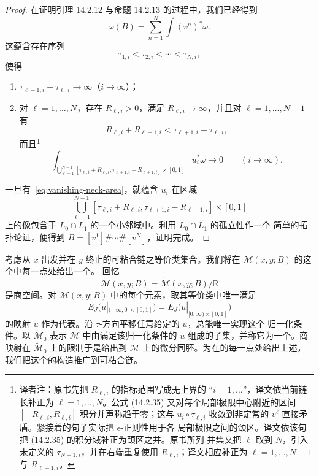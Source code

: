 \begin{proof}
在证明引理 14.2.12 与命题 14.2.13 的过程中，我们已经得到
\[
  \omega(B)
  =
  \sum_{n=1}^N\int(v^n)^*\omega.
\]
这蕴含存在序列
\[
  \tau_{1,i}<\tau_{2,i}<\cdots<\tau_{N,i},
\]
使得
\begin{enumerate}
  \item $\tau_{\ell+1,i}-\tau_{\ell,i}\to\infty$（$i\to\infty$）；
  \item 对 $\ell=1,\ldots,N$，存在 $R_{\ell,i}>0$，满足
  $R_{\ell,i}\to\infty$，并且对 $\ell=1,\ldots,N-1$ 有
  \[
    R_{\ell,i}+R_{\ell+1,i}
    <\tau_{\ell+1,i}-\tau_{\ell,i},
  \]
  而且\footnote{译者注：原书先把 $R_{\ell,i}$ 的指标范围写成无上界的
  “$i=1,\ldots$”，译文依当前链长补正为 $\ell=1,\ldots,N$。公式 (14.2.35)
  又对每个局部极限中心附近的区间
  $[-R_{\ell,i},R_{\ell,i}]$ 积分并声称趋于零；这与 $u_i\circ\tau_{\ell,i}$
  收敛到非定常的 $v^\ell$ 直接矛盾。紧接着的句子实际把 $\epsilon$-正则性用于各
  局部极限之间的颈区。译文依该句把 (14.2.35) 的积分域补正为颈区之并。原书所列
  并集又把 $\ell$ 取到 $N$，引入未定义的 $\tau_{N+1,i}$，并在右端重复使用
  $R_{\ell,i}$；译文相应补正为 $\ell=1,\ldots,N-1$ 与 $R_{\ell+1,i}$。}
  \begin{equation}
    \int_{\displaystyle
      \bigcup_{\ell=1}^{N-1}
      [\tau_{\ell,i}+R_{\ell,i},
       \tau_{\ell+1,i}-R_{\ell+1,i}]\times[0,1]}
      u_i^*\omega
    \longrightarrow0
    \qquad(i\to\infty).
  \label{eq:vanishing-neck-area}
  \end{equation}
\end{enumerate}
一旦有~\eqref{eq:vanishing-neck-area}，\termEpsilonRegularityTheorem{}就蕴含 $u_i$
在区域
\[
  \bigcup_{\ell=1}^{N-1}
  [\tau_{\ell,i}+R_{\ell,i},
   \tau_{\ell+1,i}-R_{\ell+1,i}]\times[0,1]
\]
上的像包含于 $L_0\cap L_1$ 的一个小邻域中。利用 $L_0\cap L_1$ 的孤立性作一个
简单的拓扑论证，便得到
$B=[v^1]\#\cdots\#[v^N]$，证明完成。
\end{proof}

考虑从 $x$ 出发并在 $y$ 终止的可粘合链之等价类集合。我们将在
$\mathcal M(x,y;B)$ 的这个\termSplittingEnd{}中每一点处给出一个\termNeighborhoodBasis{}。
回忆
\[
  \mathcal M(x,y;B)
  =\widetilde{\mathcal M}(x,y;B)/\mathbb R
\]
是商空间。对 $\mathcal M(x,y;B)$ 中的每个元素，取其等价类中唯一满足\termEnergyNormalization{}
\begin{equation}
  E_J\bigl(u|_{(-\infty,0]\times[0,1]}\bigr)
  =
  E_J\bigl(u|_{[0,\infty)\times[0,1]}\bigr)
\label{eq:energy-normalized-slice}
\end{equation}
的映射 $u$ 作为代表。沿 $\tau$-方向平移任意给定的 $u$，总能唯一实现这个
归一化条件。以 $\widetilde{\mathcal M}_0$ 表示
$\widetilde{\mathcal M}$ 中由满足该归一化条件的 $u$ 组成的子集，并称它为一个\termSlice{}。商映射在 $\widetilde{\mathcal M}_0$ 上的限制于是给出到
$\mathcal M$ 上的微分同胚。为在\termSplittingEnd{}的每一点处给出上述\termNeighborhoodBasis{}，我们把这个\termSlice{}的构造推广到可粘合链。

